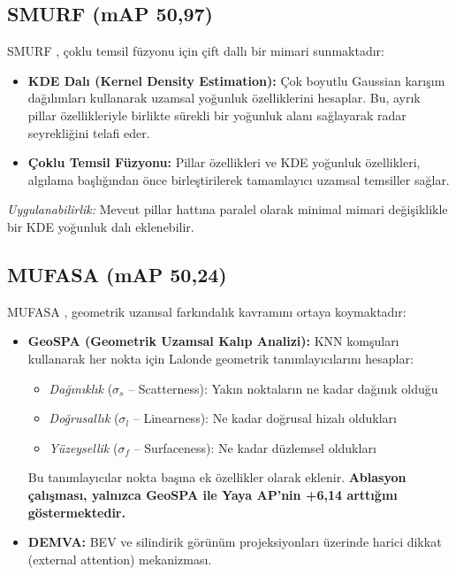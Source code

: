 \documentclass[a4paper,11pt]{article}
\begin{document}
\subsection{SMURF (mAP 50{,}97)}

SMURF \cite{smurf}, çoklu temsil füzyonu için çift dallı bir mimari sunmaktadır:

\begin{itemize}[nosep]
    \item \textbf{KDE Dalı (Kernel Density Estimation):} Çok boyutlu Gaussian karışım dağılımları kullanarak uzamsal yoğunluk özelliklerini hesaplar. Bu, ayrık pillar özellikleriyle birlikte sürekli bir yoğunluk alanı sağlayarak radar seyrekliğini telafi eder.
    \item \textbf{Çoklu Temsil Füzyonu:} Pillar özellikleri ve KDE yoğunluk özellikleri, algılama başlığından önce birleştirilerek tamamlayıcı uzamsal temsiller sağlar.
\end{itemize}

\noindent
\textit{Uygulanabilirlik:} Mevcut pillar hattına paralel olarak minimal mimari değişiklikle bir KDE yoğunluk dalı eklenebilir.

\subsection{MUFASA (mAP 50{,}24)}

MUFASA \cite{mufasa}, geometrik uzamsal farkındalık kavramını ortaya koymaktadır:

\begin{itemize}[nosep]
    \item \textbf{GeoSPA (Geometrik Uzamsal Kalıp Analizi):} KNN komşuları kullanarak her nokta için Lalonde geometrik tanımlayıcılarını hesaplar:
    \begin{itemize}[nosep]
        \item \textit{Dağınıklık} ($\sigma_s$ -- Scatterness): Yakın noktaların ne kadar dağınık olduğu
        \item \textit{Doğrusallık} ($\sigma_l$ -- Linearness): Ne kadar doğrusal hizalı oldukları
        \item \textit{Yüzeysellik} ($\sigma_f$ -- Surfaceness): Ne kadar düzlemsel oldukları
    \end{itemize}
    Bu tanımlayıcılar nokta başına ek özellikler olarak eklenir. \textbf{Ablasyon çalışması, yalnızca GeoSPA ile Yaya AP'nin +6{,}14 arttığını göstermektedir.}
    \item \textbf{DEMVA:} BEV ve silindirik görünüm projeksiyonları üzerinde harici dikkat (external attention) mekanizması.
\end{itemize}
\end{document}
